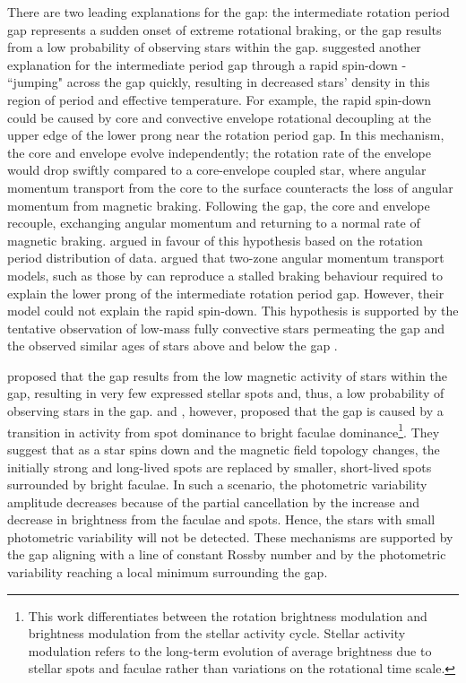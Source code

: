 There are two leading explanations for the gap: the intermediate rotation period gap represents a sudden onset of extreme rotational braking, or the gap results from a low probability of observing stars within the gap.
\citet{mcquillan_rotation_2014} suggested another explanation for the intermediate period gap through a rapid spin-down - ``jumping" across the gap quickly, resulting in decreased stars' density in this region of period and effective temperature.
For example, the rapid spin-down could be caused by core and convective envelope rotational decoupling at the upper edge of the lower prong near the rotation period gap.
In this mechanism, the core and envelope evolve independently; the rotation rate of the envelope would drop swiftly compared to a core-envelope coupled star, where angular momentum transport from the core to the surface counteracts the loss of angular momentum from magnetic braking.
Following the gap, the core and envelope recouple, exchanging angular momentum and returning to a normal rate of magnetic braking. 
\citet{gordon_stellar_2021} argued in favour of this hypothesis based on the rotation period distribution of \ktoo{} data. 
\citet{curtis_when_2020} argued that two-zone angular momentum transport models, such as those by \citet{spada_competing_2020} can reproduce a stalled braking behaviour required to explain the lower prong of the intermediate rotation period gap. However, their model could not explain the rapid spin-down.
This hypothesis is supported by the tentative observation of low-mass fully convective stars permeating the gap and the observed similar ages of stars above and below the gap \citep{lu_bridging_2022}.

\citet{chahal_statistics_2022} proposed that the gap results from the low magnetic activity of stars within the gap, resulting in very few expressed stellar spots and, thus, a low probability of observing stars in the gap.
\citet{reinhold_transition_2019} and \citet{reinhold_stellar_2020}, however, proposed that the gap is caused by a transition in activity from spot dominance to bright faculae dominance\footnote{This work differentiates between the rotation brightness modulation and brightness modulation from the stellar activity cycle. Stellar activity modulation refers to the long-term evolution of average brightness due to stellar spots and faculae rather than variations on the rotational time scale.}.
They suggest that as a star spins down and the magnetic field topology changes, the initially strong and long-lived spots are replaced by smaller, short-lived spots surrounded by bright faculae.
In such a scenario, the photometric variability amplitude decreases because of the partial cancellation by the increase and decrease in brightness from the faculae and spots.
Hence, the stars with small photometric variability will not be detected.
These mechanisms are supported by the gap aligning with a line of constant Rossby number and by the photometric variability reaching a local minimum surrounding the gap.

